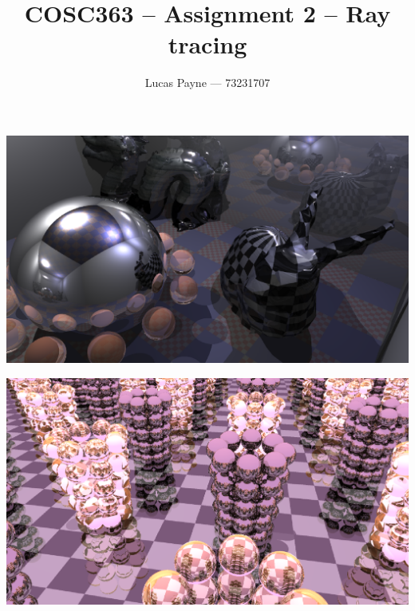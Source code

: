 \documentclass{article}
\begin{document}
\title{\textbf{COSC363 -- Assignment 2 -- Ray tracing}}
\author{Lucas Payne --- 73231707}
\date{}
\maketitle

\newcommand{\thing}[3]{
\vskip 0.2in
\hrule
\vskip 0.03in
\hrule
\vskip 0.1in
    \textbf{\textit{#3 #1}}:
#2
\vskip 0.1in
\hrule
\vskip 0.03in
\hrule
\vskip 0.2in
}
\newcommand{\feature}[2]{\thing{#1}{#2}{Feature}}
\newcommand{\leadin}[2]{
    \textit{#1}
    \vskip 0.1in
    \hrule
    \vskip 0.08in
    #2
    \vskip 0.6cm
}

\begin{center}\includegraphics[width=\linewidth]{../screenshots/report_main_1.png}\end{center}
\begin{center}\includegraphics[width=\linewidth]{../screenshots/report_main_2.png}\end{center}

\newpage
\end{document}
